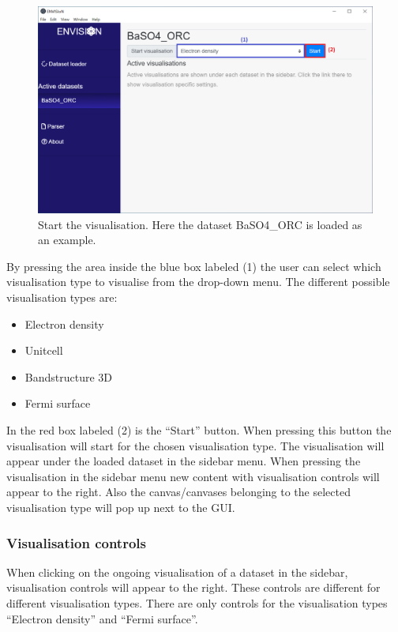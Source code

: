 \begin{figure}[H]
    \centering
    \includegraphics[scale = 0.45]{Images/GUI_Chosevistype.png}
    \caption{Start the visualisation. Here the dataset BaSO4\_ORC is loaded as an example.}
    \label{fig:GUIChosevistype}
\end{figure}

By pressing the area inside the blue box labeled (1) the user can select which visualisation type to visualise from the drop-down menu. The different possible visualisation types are: 

\begin{itemize}
    \item Electron density
    \item Unitcell
    \item Bandstructure 3D
    \item Fermi surface
\end{itemize}

In the red box labeled (2) is the ``Start'' button. When pressing this button the visualisation will start for the chosen visualisation type. The visualisation will appear under the loaded dataset in the sidebar menu. When pressing the visualisation in the sidebar menu new content with visualisation controls will appear to the right. Also the canvas/canvases belonging to the selected visualisation type will pop up next to the GUI.

\subsubsection{Visualisation controls}
When clicking on the ongoing visualisation of a dataset in the sidebar, visualisation controls will appear to the right. These controls are different for different visualisation types. There are only controls for the visualisation types ``Electron density'' and ``Fermi surface''. 

